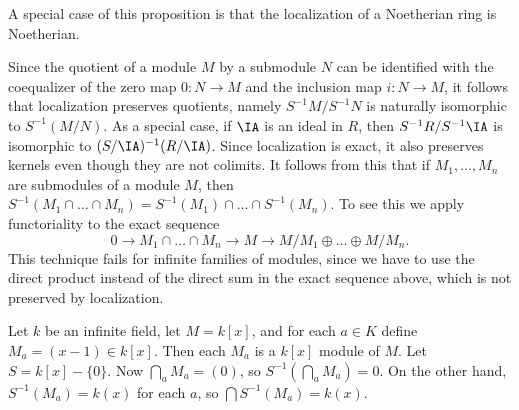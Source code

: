 \begin{remark}
    A special case of this proposition is that the localization of a Noetherian ring is Noetherian.
\end{remark}

Since the quotient of a module $M$ by a submodule $N$ can be identified with the coequalizer of the zero map $0: N \to M$ and the inclusion map $i: N \to M$, it follows that localization preserves quotients, namely $S^{-1}M / S^{-1}N$ is naturally isomorphic to $S^{-1}(M/N)$. As a special case, if $\IA$ is an ideal in $R$, then $S^{-1}R / S^{-1} \IA$ is isomorphic to $(S/\IA)^{-1}(R/\IA)$. Since localization is exact, it also preserves kernels even though they are not colimits. It follows from this that if $M_1, \dots, M_n$ are submodules of a module $M$, then $S^{-1}(M_1 \cap \dots \cap M_n) = S^{-1}(M_1) \cap \dots \cap S^{-1}(M_n)$. To see this we apply functoriality to the exact sequence
%
\[ 0 \to M_1 \cap \dots \cap M_n \to M \to M/M_1 \oplus \dots \oplus M/M_n. \]
%
This technique fails for infinite families of modules, since we have to use the direct product instead of the direct sum in the exact sequence above, which is not preserved by localization.

\begin{example}
    Let $k$ be an infinite field, let $M = k[x]$, and for each $a \in K$ define $M_a = (x - 1) \in k[x]$. Then each $M_a$ is a $k[x]$ module of $M$. Let $S = k[x] - \{ 0 \}$. Now $\bigcap_a M_a = (0)$, so $S^{-1}(\bigcap_a M_a) = 0$. On the other hand, $S^{-1}(M_a) = k(x)$ for each $a$, so $\bigcap S^{-1}(M_a) = k(x)$.
\end{example}

